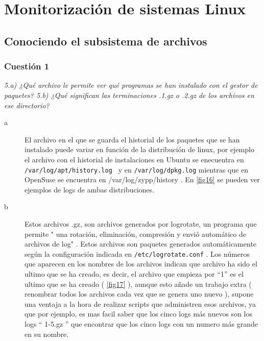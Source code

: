 



\maketitle %
\newpage %
\tableofcontents %
\listoffigures
\newpage

\section{Monitorización de sistemas Linux}
\subsection{Conociendo el subsistema de archivos}


\subsubsection{Cuestión 1}
\textit{5.a) ¿Qué archivo le permite ver qué programas se han instalado con el gestor de paquetes? 5.b) ¿Qué significan las terminaciones .1.gz o .2.gz de los archivos en ese directorio?}

\begin{description}
  \item[a] El archivo en el que se guarda el historial de los paquetes que se han instalado puede variar en función de la distribución de linux, por ejemplo el archivo con el historial de instalaciones en Ubuntu se enecuentra en \texttt{/var/log/apt/history.log } y en \texttt{/var/log/dpkg.log} mientras que en OpenSuse se encuentra en /var/log/zypp/history \cite{log1} \cite{log2}. En \cref{fig16} se pueden ver ejemplos de logs de ambas distribuciones. 
  
  \item[b] Estos archivos .gz, son archivos generados por logrotate, un programa que permite " una rotación, eliminación, compresión y envió automático de archivos de log" \cite{logrot1}. Estos archivos son paquetes generados automáticamente según la configuración indicada en \texttt{/etc/logrotate.conf} \cite{logrot}. Los números que aparecen en los nombres de los archivos indican que archivo ha sido el ultimo que se ha creado, es decir, el archivo que empieza por ``1'' es el ultimo que se ha creado ( \cref{fig17} ), aunque esto añade un trabajo extra ( renombrar todos los archivos cada vez que se genera uno nuevo ), supone una ventaja a la hora de realizar scripts que administren esos archivos, ya que por ejemplo, es mas facil saber que los cinco logs más nuevos son los logs `` 1-5.gz '' que encontrar que los cinco logs con un numero más grande en su nombre.
\end{description}

